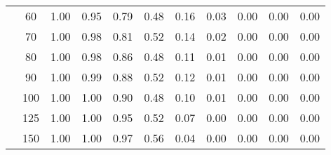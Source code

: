 \begin{table}[t]
\begin{center}
\begin{subtable}[c]{\textwidth}
\begin{center}
\begin{tabular}{rcccccccccc}
                                        & \multicolumn{1}{c|}{60}  & \num{1.00}  & \num{0.95}  & \num{0.79}  & \num{0.48}  & \num{0.16}  & \num{0.03}  & \num{0.00}  & \num{0.00}  & \num{0.00}  \\
                                        & \multicolumn{1}{c|}{70}  & \num{1.00}  & \num{0.98}  & \num{0.81}  & \num{0.52}  & \num{0.14}  & \num{0.02}  & \num{0.00}  & \num{0.00}  & \num{0.00}  \\
                                        & \multicolumn{1}{c|}{80}  & \num{1.00}  & \num{0.98}  & \num{0.86}  & \num{0.48}  & \num{0.11}  & \num{0.01}  & \num{0.00}  & \num{0.00}  & \num{0.00}  \\
                                        & \multicolumn{1}{c|}{90}  & \num{1.00}  & \num{0.99}  & \num{0.88}  & \num{0.52}  & \num{0.12}  & \num{0.01}  & \num{0.00}  & \num{0.00}  & \num{0.00}  \\
                                        & \multicolumn{1}{c|}{100}  & \num{1.00}  & \num{1.00}  & \num{0.90}  & \num{0.48}  & \num{0.10}  & \num{0.01}  & \num{0.00}  & \num{0.00}  & \num{0.00}  \\
                                        & \multicolumn{1}{c|}{125}  & \num{1.00}  & \num{1.00}  & \num{0.95}  & \num{0.52}  & \num{0.07}  & \num{0.00}  & \num{0.00}  & \num{0.00}  & \num{0.00}  \\
                                        & \multicolumn{1}{c|}{150}  & \num{1.00}  & \num{1.00}  & \num{0.97}  & \num{0.56}  & \num{0.04}  & \num{0.00}  & \num{0.00}  & \num{0.00}  & \num{0.00}  \\
                                    \end{tabular}
            \end{center}
        \end{subtable}

        \vspace{5mm}


\end{center}
\end{table}
